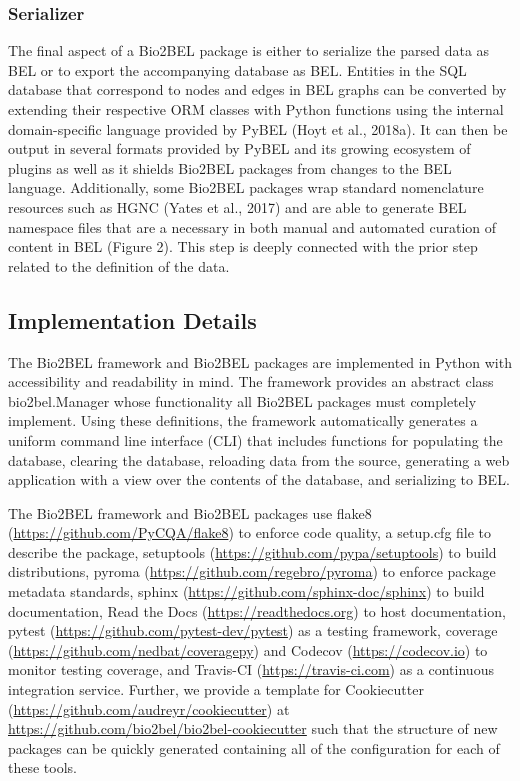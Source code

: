 \subsubsection*{Serializer}
The final aspect of a Bio2BEL package is either to serialize the parsed data as BEL or to export the accompanying database as BEL. Entities in the SQL database that correspond to nodes and edges in BEL graphs can be converted by extending their respective ORM classes with Python functions using the internal domain-specific language provided by PyBEL (Hoyt et al., 2018a).
It can then be output in several formats provided by PyBEL and its growing ecosystem of plugins as well as it shields Bio2BEL packages from changes to the BEL language.
Additionally, some Bio2BEL packages wrap standard nomenclature resources such as HGNC (Yates et al., 2017) and are able to generate BEL namespace files that are a necessary in both manual and automated curation of content in BEL (Figure 2).
This step is deeply connected with the prior step related to the definition of the data.

\subsection*{Implementation Details}
The Bio2BEL framework and Bio2BEL packages are implemented in Python with accessibility and readability in mind.
The framework provides an abstract class bio2bel.Manager whose functionality all Bio2BEL packages must completely implement.
Using these definitions, the framework automatically generates a uniform command line interface (CLI) that includes functions for populating the database, clearing the database, reloading data from the source, generating a web application with a view over the contents of the database, and serializing to BEL\@.

The Bio2BEL framework and Bio2BEL packages use flake8 (\url{https://github.com/PyCQA/flake8}) to enforce code quality, a setup.cfg file to describe the package, setuptools (\url{https://github.com/pypa/setuptools}) to build distributions, pyroma (\url{https://github.com/regebro/pyroma}) to enforce package metadata standards, sphinx (\url{https://github.com/sphinx-doc/sphinx}) to build documentation, Read the Docs (\url{https://readthedocs.org}) to host documentation, pytest (\url{https://github.com/pytest-dev/pytest}) as a testing framework, coverage (\url{https://github.com/nedbat/coveragepy}) and Codecov (\url{https://codecov.io}) to monitor testing coverage, and Travis-CI (\url{https://travis-ci.com}) as a continuous integration service.
Further, we provide a template for Cookiecutter (\url{https://github.com/audreyr/cookiecutter}) at \url{https://github.com/bio2bel/bio2bel-cookiecutter} such that the structure of new packages can be quickly generated containing all of the configuration for each of these tools.

